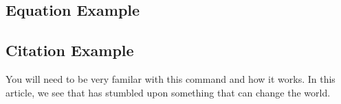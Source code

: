\documentclass[./dissertation.tex]{subfiles}
\begin{document}
      \subsection{Equation Example}

      \subsection{Citation Example}
      You will need to be very familar with this command and how it works. In this article, we see that \cite{article1} has stumbled upon something that can change the world.
\end{document}
